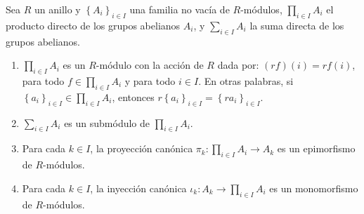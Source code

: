 \documentclass[12pt]{report}
\newcounter{it}
\theoremstyle{largebreak}
\newcommand\cf[3]{\ensuremath{#1:#2\rightarrow#3}}
\begin{document}
    \begin{theor}
        Sea $R$ un anillo y $\left\{A_i \right\}_{ i\in I}$ una familia no vacía de $R$-módulos, $\prod_{ i\in I}A_i$ el producto directo de los grupos abelianos $A_i$, y $\sum_{ i\in I}A_i$ la suma directa de los grupos abelianos.
        \begin{enumerate}[label = \textit{(\alph*)}]
            \item $\prod_{ i\in I}A_i$ es un $R$-módulo con la acción de $R$ dada por: $(rf)(i)=rf(i)$, para todo $f\in\prod_{ i\in I}A_i$ y para todo $i\in I$. En otras palabras, si $\left\{a_i \right\}_{ i\in I}\in\prod_{ i\in I}A_i$, entonces $r\left\{a_i \right\}_{ i\in I}=\left\{ra_i \right\}_{ i\in I}$.
            \item $\sum_{ i\in I}A_i$ es un submódulo de $\prod_{ i\in I}A_i$.
            \item Para cada $k\in I$, la proyección canónica $\cf{\pi_k}{\prod_{ i\in I}A_i}{A_k}$ es un epimorfismo de $R$-módulos.
            \item Para cada $k\in I$, la inyección canónica $\cf{\iota_k}{A_k}{\prod_{ i\in I}A_i}$ es un monomorfismo de $R$-módulos.
        \end{enumerate}
    \end{theor}
\end{document}
